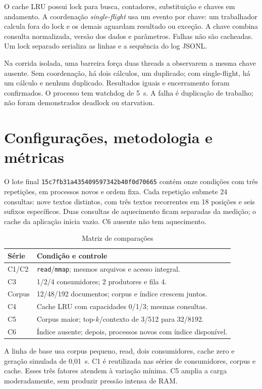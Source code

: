 \documentclass[12pt,a4paper]{article}
\newcommand{\secao}[1]{\clearpage\section{#1}}
\begin{document}
  O cache LRU possui lock para busca, contadores, substituição e chaves em andamento. A coordenação \textit{single-flight} usa um evento por chave: um trabalhador calcula fora do lock e os demais aguardam resultado ou exceção. A chave combina consulta normalizada, versão dos dados e parâmetros. Falhas não são cacheadas. Um lock separado serializa as linhas e a sequência do log JSONL.

  Na corrida isolada, uma barreira força duas threads a observarem a mesma chave ausente. Sem coordenação, há dois cálculos, um duplicado; com single-flight, há um cálculo e nenhum duplicado. Resultados iguais e encerramento foram confirmados. O processo tem watchdog de 5~s. A falha é duplicação de trabalho; não foram demonstrados deadlock ou starvation.

  \secao{Configurações, metodologia e métricas}
  O lote final \texttt{15c7fb31a435409597342b40f0d70665} contém onze condições com três repetições, em processos novos e ordem fixa. Cada repetição submete 24 consultas: nove textos distintos, com três textos recorrentes em 18 posições e seis sufixos específicos. Duas consultas de aquecimento ficam separadas da medição; o cache da aplicação inicia vazio. C6 ausente não tem aquecimento.

  \begin{table}[H]
  \centering\caption{Matriz de comparações}\label{tab:matriz}
  \begin{singlespace}\small
  \begin{tabularx}{\textwidth}{lX}
  \toprule\textbf{Série} & \textbf{Condição e controle}\\\midrule
  C1/C2 & \texttt{read}/\texttt{mmap}; mesmos arquivos e acesso integral.\\
  C3 & 1/2/4 consumidores; 2 produtores e fila 4.\\
  Corpus & 12/48/192 documentos; corpus e índice crescem juntos.\\
  C4 & Cache LRU com capacidades 0/1/3; mesmas consultas.\\
  C5 & Corpus maior; top-$k$/contexto de 3/512 para 32/8192.\\
  C6 & Índice ausente; depois, processos novos com índice disponível.\\\bottomrule
  \end{tabularx}\end{singlespace}
  \end{table}
  A linha de base usa corpus pequeno, read, dois consumidores, cache zero e geração simulada de 0,01~s. C1 é reutilizada nas séries de consumidores, corpus e cache. Esses três fatores atendem à variação mínima. C5 amplia a carga moderadamente, sem produzir pressão intensa de RAM.
\end{document}
